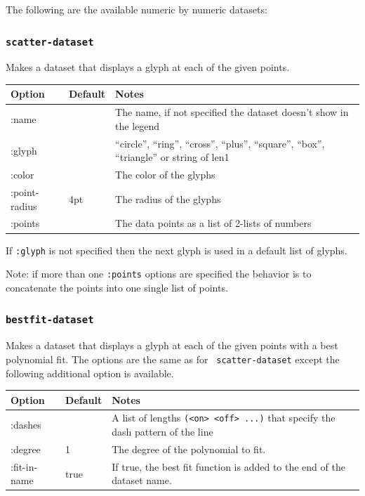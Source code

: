 \documentclass{article}
\begin{document}
The following are the available numeric by numeric datasets:

\subsubsection{\tt scatter-dataset}

Makes a dataset that displays a glyph at each of the given points.

\begin{center}
\begin{tabular}{lll}
Option & Default & Notes \\
\hline
:name & & The name, if not specified the dataset doesn't show in
the legend\\
:glyph & & ``circle'', ``ring'', ``cross'', ``plus'', ``square'',
``box'', ``triangle'' or string of len1\\
:color & & The color of the glyphs\\
:point-radius & 4pt & The radius of the glyphs\\
:points & & The data points as a list of 2-lists of numbers\\
\end{tabular}
\end{center}

If {\tt :glyph} is not specified then the next glyph is used in a
default list of glyphs.

Note: if more than one {\tt :points} options are specified the
behavior is to concatenate the points into one single list of points.

\subsubsection{\tt bestfit-dataset}

Makes a dataset that displays a glyph at each of the given points with
a best polynomial fit.  The options are the same as for {\tt
  scatter-dataset} except the following additional option is
available.

\begin{center}
\begin{tabular}{lll}
Option & Default & Notes \\
\hline
:dashes & & A list of lengths {\tt (<on> <off> ...)} that specify the
dash pattern of the line\\
:degree & 1 & The degree of the polynomial to fit. \\
:fit-in-name & true & If true, the best fit function is added to the end
of the dataset name.\\
\end{tabular}
\end{center}
\end{document}
